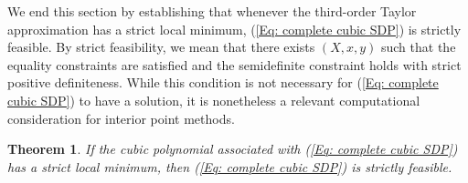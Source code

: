 \documentclass[11pt]{article}
\theoremstyle{plain}
\newtheorem{theorem}{Theorem}[section]
\theoremstyle{definition}
\theoremstyle{remark}
\begin{document}
We end this section by establishing that whenever the third-order Taylor approximation has a strict local minimum, (\ref{Eq: complete cubic SDP}) is strictly feasible. By strict feasibility, we mean that there exists $(X,x,y)$ such that the equality constraints are satisfied and the semidefinite constraint holds with strict positive definiteness. While this condition is not necessary for (\ref{Eq: complete cubic SDP}) to have a solution, it is nonetheless a relevant computational consideration for interior point methods.

\begin{theorem}\label{Thm: SLM strictly feasible}
    If the cubic polynomial associated with (\ref{Eq: complete cubic SDP}) has a strict local minimum, then (\ref{Eq: complete cubic SDP}) is strictly feasible.
\end{theorem}
\end{document}
